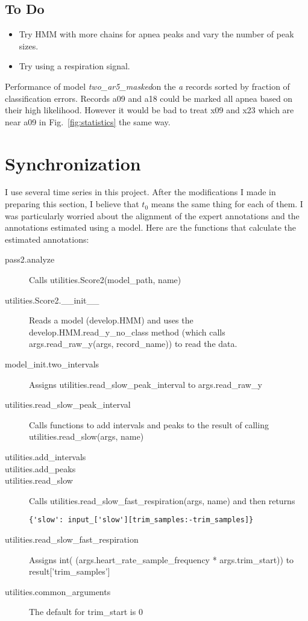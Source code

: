 \documentclass[12pt]{article}
\newcommand{\BestModel}{\emph{two\_ar5\_masked}}
\begin{document}
\subsection{To Do}

\begin{itemize}
\item Try HMM with more chains for apnea peaks and vary the number of
  peak sizes.
\item Try using a respiration signal.
\end{itemize}

\begin{table*}
  \centering
  
  \caption[Performance]{Performance of model \BestModel on the
    \emph{a} records sorted by fraction of classification errors.
    Records a09 and a18 could be marked all apnea based on their high
    likelihood.  However it would be bad to treat x09 and x23 which
    are near a09 in Fig.~\ref{fig:statistics} the same way.}
  \label{tab:pass2performance}
\end{table*}

\section{Synchronization}
\label{sec:sync}

I use several time series in this project.  After the modifications I
made in preparing this section, I believe that $t_0$ means the same
thing for each of them.  I was particularly worried about the alignment
of the expert annotations and the annotations estimated using a model.
Here are the functions that calculate the estimated annotations:
\begin{description}
\item[pass2.analyze] Calls utilities.Score2(model\_path, name)
\item[utilities.Score2.\_\_init\_\_] Reads a model (develop.HMM) and
  uses the develop.HMM.read\_y\_no\_class method (which calls
  args.read\_raw\_y(args, record\_name)) to read the data.
\item[model\_init.two\_intervals] Assigns
  utilities.read\_slow\_peak\_interval to args.read\_raw\_y
\item[utilities.read\_slow\_peak\_interval] Calls functions to add
  intervals and peaks to the result of calling
  utilities.read\_slow(args, name)
\item[utilities.add\_intervals] 
\item[utilities.add\_peaks]
\item[utilities.read\_slow] Calls
  utilities.read\_slow\_fast\_respiration(args, name) and then returns
\begin{verbatim}
{'slow': input_['slow'][trim_samples:-trim_samples]}
\end{verbatim}
\item[utilities.read\_slow\_fast\_respiration] Assigns int(
  (args.heart\_rate\_sample\_frequency * args.trim\_start)) to
  result['trim\_samples']
\item[utilities.common\_arguments] The default for trim\_start is 0
\end{description}
\end{document}
